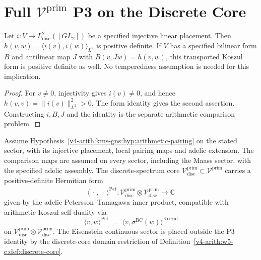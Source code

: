 \section{Full \(\mathcal{V}^{\mathrm{prim}}\) P3 on the Discrete Core}
\label{v4-arith:w5-c:P3-statement}

\begin{proposition}
\label{v4-arith:w5-c:prop:positive-pullback}
Let \(i:V\to L^2_{\mathrm{disc}}([GL_2])\) be a specified injective
linear placement. Then \(h(v,w)=\langle i(v),i(w)\rangle_{L^2}\)
is positive definite. If \(V\) has a specified bilinear form \(B\)
and antilinear map \(J\) with \(B(v,Jw)=h(v,w)\), this transported
Koszul form is positive definite as well. No temperedness assumption
is needed for this implication.
\end{proposition}
\begin{proof}
For \(v\ne0\), injectivity gives \(i(v)\ne0\), and hence
\(h(v,v)=\|i(v)\|_{L^2}^2>0\). The form identity gives the
second assertion. Constructing \(i,B,J\) and the identity is the
separate arithmetic comparison problem.
\end{proof}

\begin{theorem}
\label{v4-arith:w5-c:thm:P3-discrete-core}
Assume Hypothesis~\ref{v4-arith:kms-gns:hyp:arithmetic-pairing}
on the stated sector, with its injective placement, local pairing maps
and adelic extension.
The comparison maps are assumed on every sector, including the
Maass sector, with the specified adelic assembly. The
discrete-spectrum core
\(\mathcal{V}^{\mathrm{prim}}_{\mathrm{disc}}\subset\mathcal{V}^{\mathrm{prim}}\)
carries a positive-definite Hermitian form
\begin{equation}
\label{v4-arith:w5-c:eq:P3-form}
\langle\,\cdot\,,\,\cdot\,\rangle^{\mathrm{Pet}}\colon\mathcal{V}^{\mathrm{prim}}_{\mathrm{disc}}\otimes\overline{\mathcal{V}^{\mathrm{prim}}_{\mathrm{disc}}}\to\mathbb{C}
\end{equation}
given by the adelic Petersson--Tamagawa inner product, compatible
with arithmetic Koszul self-duality via
\begin{equation}
\label{v4-arith:w5-c:eq:P3-compatibility}
\langle v,w\rangle^{\mathrm{Pet}}\;=\;\langle v,\sigma^{\mathrm{BC}}(w)\rangle^{\mathrm{Koszul}}
\end{equation}
on \(\mathcal{V}^{\mathrm{prim}}_{\mathrm{disc}}\otimes\mathcal{V}^{\mathrm{prim}}_{\mathrm{disc}}\).
The Eisenstein continuous sector is placed outside the P3 identity
by the discrete-core domain restriction of
Definition~\ref{v4-arith:w5-c:def:discrete-core}.
\end{theorem}


